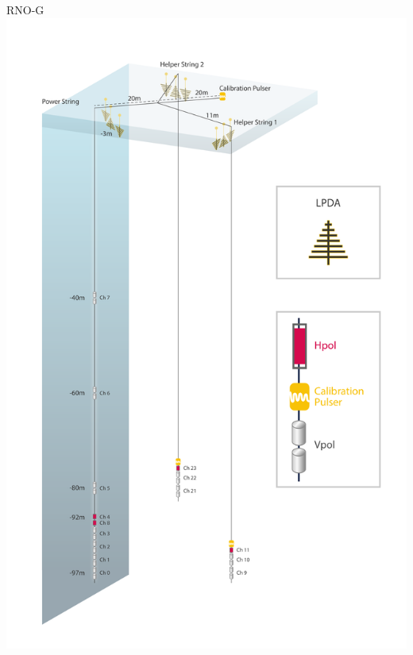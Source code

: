 \documentclass{beamer}
\begin{document}
\begin{frame}{RNO-G}
  \centering
  \includegraphics[height=0.9\textheight]{figures/detector.pdf}
\end{frame}
\end{document}
